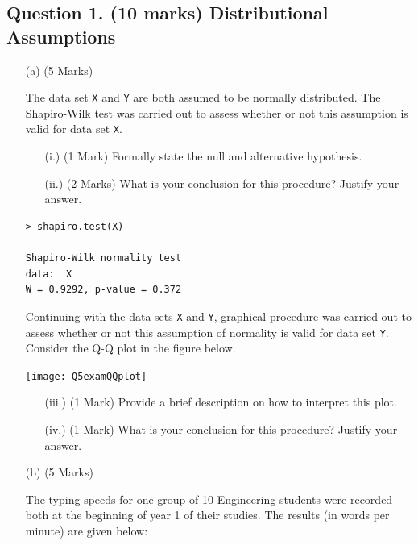 \documentclass[a4paper,12pt]{article}
\begin{document}
\subsection*{Question 1. (10 marks) Distributional Assumptions}
\begin{itemize}
\item[(a)] (5 Marks) 

The data set \texttt{X} and \texttt{Y} are both assumed to be normally distributed. The Shapiro-Wilk test was carried out to assess whether or not this assumption is valid for data set \texttt{X}.
\begin{itemize}
	\item[(i.)] (1 Mark) Formally state the null and alternative hypothesis.
	\item[(ii.)] (2 Marks) What is your conclusion for this procedure? Justify your answer.
\end{itemize}
\begin{framed}
\begin{verbatim}
> shapiro.test(X)
	
Shapiro-Wilk normality test
data:  X
W = 0.9292, p-value = 0.372
\end{verbatim}
\end{framed}

 Continuing with the data sets \texttt{X} and \texttt{Y}, graphical procedure was carried out to assess whether or not this assumption of normality is valid for data set \texttt{Y}. Consider the Q-Q plot in the figure below.

\begin{center}
	\texttt{[image: Q5examQQplot]}
\end{center}

\begin{itemize}
	\item[(iii.)] (1 Mark) Provide a brief description on how to interpret this plot.
	\item[(iv.)] (1 Mark) What is your conclusion for this procedure? Justify your answer.
\end{itemize}

\item[(b)] (5 Marks) 

The typing speeds for one group of 10 Engineering students were recorded both at the beginning of year 1 of their studies. The results (in words per minute) are given below:


\end{itemize}
\end{document}

